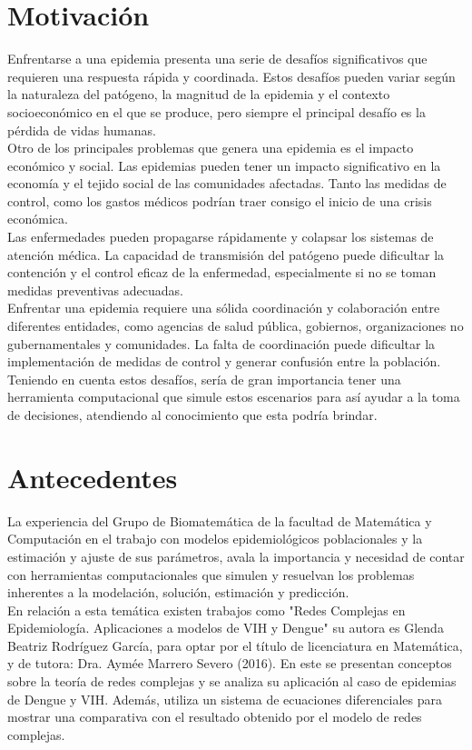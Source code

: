 \section{Motivación}
Enfrentarse a una epidemia presenta una serie de desafíos significativos que requieren 
una respuesta rápida y coordinada. Estos desafíos pueden variar según la naturaleza del 
patógeno, la magnitud de la epidemia y el contexto socioeconómico en el que se produce, 
pero siempre el principal desafío es la pérdida de vidas humanas.\\
Otro de los principales problemas que genera una epidemia es el impacto económico y social. 
Las epidemias pueden tener un impacto significativo en la economía y el tejido social 
de las comunidades afectadas. Tanto las medidas de control, como los gastos médicos podrían 
traer consigo el inicio de una crisis económica.\\
Las enfermedades pueden propagarse rápidamente y colapsar los sistemas de atención 
médica. La capacidad de transmisión del patógeno puede dificultar la contención y el control 
eficaz de la enfermedad, especialmente si no se toman medidas preventivas adecuadas.\\
Enfrentar una epidemia requiere una sólida coordinación y colaboración entre diferentes 
entidades, como agencias de salud pública, gobiernos, organizaciones no gubernamentales y 
comunidades. La falta de coordinación puede dificultar la implementación de medidas de 
control y generar confusión entre la población.\\
Teniendo en cuenta estos desafíos, sería de gran importancia tener una herramienta 
computacional que simule estos escenarios para así ayudar a la toma de decisiones, atendiendo 
al conocimiento que esta podría brindar.\\

\section{Antecedentes}
La experiencia del Grupo de Biomatemática de la facultad de Matemática y Computación en el trabajo 
con modelos epidemiológicos poblacionales y la estimación y ajuste de sus parámetros, avala la 
importancia y necesidad de contar con herramientas computacionales que simulen y resuelvan los problemas 
inherentes a la modelación, solución, estimación y predicción.\\
En relación a esta temática existen trabajos como "Redes Complejas en Epidemiología. Aplicaciones a 
modelos de VIH y Dengue" su autora es Glenda Beatriz Rodríguez García, para optar por el título 
de licenciatura en Matemática, y de tutora: Dra. Aymée Marrero Severo (2016). En este se presentan
conceptos sobre la teoría de redes complejas y se analiza su aplicación al caso de epidemias de Dengue
y VIH. Además, utiliza un sistema de ecuaciones diferenciales para mostrar una comparativa con el 
resultado obtenido por el modelo de redes complejas.\\ 

